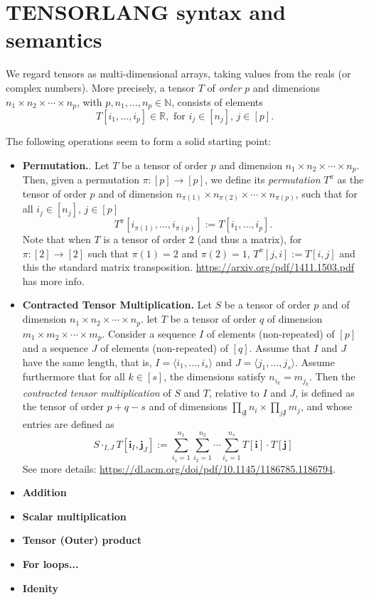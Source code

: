 \section{TENSORLANG syntax and semantics}\label{sec:tensorlang}


We regard tensors as multi-dimensional arrays, taking values from the reals (or complex numbers).
More precisely, a tensor $T$ of \textit{order} $p$ and dimensions $n_1\times n_2\times\cdots\times n_p$,
with $p,n_1,\ldots,n_p\in \mathbb{N}$, consists of elements
$$T[i_1,\ldots,i_p]\in\mathbb{R}, \text{ for $i_j\in [n_j]$, $j\in[p]$}.$$

The following operations seem to form a solid starting point:

\begin{itemize}
\item \textbf{Permutation.}. Let $T$ be a tensor of order $p$ and dimension $n_1\times n_2\times\cdots\times n_p$. Then, given a permutation 
$\pi:[p]\to [p]$, we define its \textit{permutation} $T^\pi$ as the tensor of order $p$ and of dimension
$n_{\pi(1)}\times n_{\pi(2)}\times\cdots\times n_{\pi(p)}$, such that for all $i_j\in[n_j]$, $j\in[p]$
$$
T^{\pi}[i_{\pi(1)},\ldots,i_{\pi(p)}]:=T[i_1,\ldots,i_p].
$$
Note that when $T$ is a tensor of order $2$ (and thus a matrix), for $\pi:[2]\to[2]$ such that $\pi(1)=2$ and $\pi(2)=1$,
$T^\pi[j,i]:=T[i,j]$ and this the standard matrix transposition. \url{https://arxiv.org/pdf/1411.1503.pdf} has more info.

\item \textbf{Contracted Tensor Multiplication.} Let $S$ be a tensor of order $p$ and of dimension $n_1\times n_2\times\cdots\times n_p$. let 
$T$ be a tensor of order $q$ of dimension $m_1\times m_2\times\cdots\times m_p$. Consider a sequence
$I$ of elements (non-repeated) of $[p]$ and a sequence $J$ of elements (non-repeated) of $[q]$. Assume that 
$I$ and $J$ have the same length, that is, $I=\langle i_1,\ldots,i_s\rangle$ and $J=\langle j_1,\ldots,j_s\rangle$. Assume furthermore that for all $k\in[s]$, the dimensions satisfy $n_{i_k}=m_{j_k}$. Then the \textit{contracted tensor multiplication} of $S$ and $T$, relative to $I$ and $J$, is defined as the tensor
of order $p+q-s$ and of dimensions $\prod_{ i\not I} n_i\times \prod_{j\not J} m_j$, and whose entries are defined as
$$
S\cdot_{I,J} T[\mathbf{i}_I,\mathbf{j}_J]:=\sum_{i_1=1}^{n_1}\sum_{i_2=1}^{n_2}\cdots\sum_{i_s=1}^{n_s} T[\mathbf{i}]\cdot T[\mathbf{j}]
$$
See more details: \url{https://dl.acm.org/doi/pdf/10.1145/1186785.1186794}.

\item \textbf{Addition}

\item \textbf{Scalar multiplication}

\item \textbf{Tensor (Outer) product}

\item \textbf{For loops...}

\item \textbf{Idenity}
 \end{itemize}


